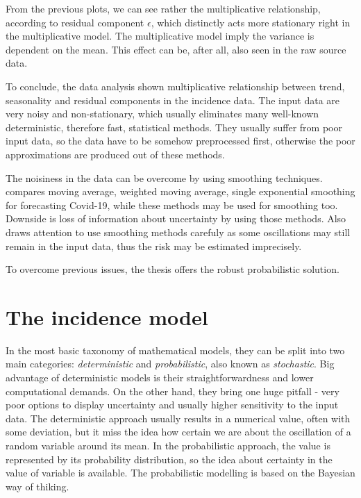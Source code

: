 \documentclass[
  digital, %
  oneside, %
  lof,     %
  lot,     %
]{fithesis4}
\begin{document}
From the previous plots, we can see rather the multiplicative 
relationship, according to residual component $\epsilon$, 
which distinctly acts more stationary right in the 
multiplicative model. 
The multiplicative model imply the variance is dependent 
on the mean. This effect can be, after all, also seen 
in the raw source data.

To conclude, the data analysis shown multiplicative 
relationship between trend, seasonality and residual 
components in the incidence data. 
The input data are very noisy and non-stationary, which 
usually eliminates many well-known deterministic, therefore 
fast, statistical methods. 
They usually suffer from poor input data, so the data have 
to be somehow preprocessed first, otherwise the poor 
approximations are produced out of these methods.

The noisiness in the data can be overcome by using 
smoothing techniques.
\cite{elmousalami2020} compares moving average, weighted 
moving average, single exponential smoothing for 
forecasting Covid-19, while these methods may be used 
for smoothing too. 
Downside is loss of information about uncertainty by using 
those methods. 
Also \cite{annunziato2020} draws attention to use smoothing 
methods carefuly as some oscillations may still remain in 
the input data, thus the risk may be estimated imprecisely.

To overcome previous issues, the thesis offers the robust 
probabilistic solution.



\chapter{The incidence model}

In the most basic taxonomy of mathematical models, they can be 
split into two main categories: \textit{deterministic} and 
\textit{probabilistic}, also known as \textit{stochastic}. 
Big advantage of deterministic models is their 
straightforwardness and lower computational demands. 
On the other hand, they bring one huge pitfall - very 
poor options to display uncertainty and usually higher 
sensitivity to the input data. 
The deterministic approach usually results in a numerical 
value, often with some deviation, but it miss the idea 
how certain we are about the oscillation of a random 
variable around its mean. 
In the probabilistic approach, the value is represented 
by its probability distribution, so the idea about 
certainty in the value of variable is available. 
The probabilistic modelling is based on the Bayesian 
way of thiking.
\end{document}
